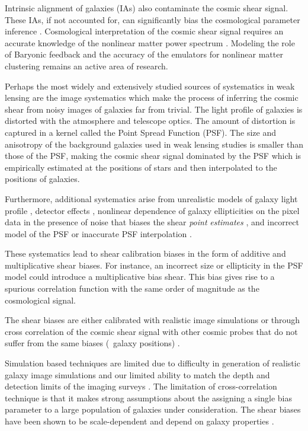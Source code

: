 Intrinsic alignment of galaxies (IAs) also contaminate the cosmic shear signal. These IAs, if not accounted for, 
can significantly bias the cosmological parameter inference \citep{codis2015,joachimi2015, kirk2015,krause_ia}. 
Cosmological interpretation of the cosmic shear signal requires an accurate knowledge of the nonlinear 
matter power spectrum \citep{semboloni2013, eifler2015, schaye2015, joudaki2016, kitching2016, mead2016}. Modeling the role of 
Baryonic feedback and the accuracy of the emulators for nonlinear matter clustering remains an active area of research. 

Perhaps the most widely and extensively studied sources of systematics in weak lensing are the image systematics which make 
the process of inferring the cosmic shear from noisy images of galaxies far from trivial. The light profile of 
galaxies is distorted with the atmosphere and telescope optics. The amount of distortion is captured in a kernel called 
the Point Spread Function (PSF). The size and anisotropy of the background galaxies used in weak lensing studies is 
smaller than those of the PSF, making the cosmic shear signal dominated by the PSF which is empirically estimated at the positions of stars and 
then interpolated to the positions of galaxies.  

Furthermore, additional systematics arise from unrealistic models of galaxy light profile \citep{voight2010,im3shape,kac2014}, 
detector effects \citep{arun2016,jaya2016,plazas2016}, nonlinear dependence of galaxy ellipticities 
on the pixel data in the presence of noise that biases the shear \emph{point} \emph{estimates} \citep{melchoir,great3,conti2017}, 
and incorrect model of the PSF or inaccurate PSF interpolation \citep{rowe2010,kuijken2015,great3,des}.

These systematics lead to shear calibration biases in the form of additive and multiplicative 
shear biases. For instance, an incorrect size or ellipticity in the PSF model could introduce 
a multiplicative bias shear. This bias gives rise to a spurious correlation function with the 
same order of magnitude as the cosmological signal.

The shear biases are either calibrated with realistic image simulations \citep{im3shape,jee2016,conti2017} or through cross correlation of 
the cosmic shear signal with other cosmic probes that do not suffer from the same biases (\eg\ galaxy positions)
\citep{liu2016,schann,singh2017}. 

Simulation based techniques are limited due to difficulty in 
generation of realistic galaxy image simulations \citep{great3,lanus2017} and our limited ability to match the depth and detection limits of 
the imaging surveys \citep{hoekstra}. The limitation of cross-correlation technique is that it makes strong assumptions about the assigning a 
single bias parameter to a large population of galaxies under consideration. The shear biases have been shown to be scale-dependent \citep{des,jee2016} 
and depend on galaxy properties \citep{im3shape,conti2017}. 

